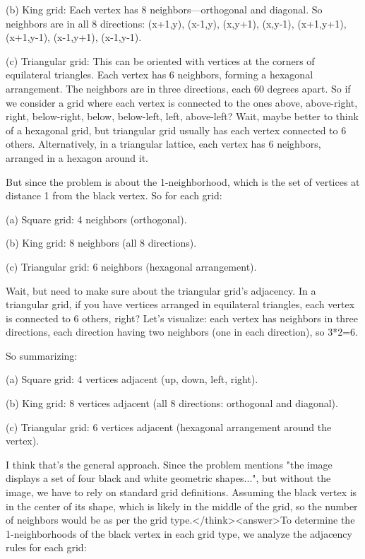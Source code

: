 (b) King grid: Each vertex has 8 neighbors—orthogonal and diagonal. So neighbors are in all 8 directions: (x+1,y), (x-1,y), (x,y+1), (x,y-1), (x+1,y+1), (x+1,y-1), (x-1,y+1), (x-1,y-1).

(c) Triangular grid: This can be oriented with vertices at the corners of equilateral triangles. Each vertex has 6 neighbors, forming a hexagonal arrangement. The neighbors are in three directions, each 60 degrees apart. So if we consider a grid where each vertex is connected to the ones above, above-right, right, below-right, below, below-left, left, above-left? Wait, maybe better to think of a hexagonal grid, but triangular grid usually has each vertex connected to 6 others. Alternatively, in a triangular lattice, each vertex has 6 neighbors, arranged in a hexagon around it.

But since the problem is about the 1-neighborhood, which is the set of vertices at distance 1 from the black vertex. So for each grid:

(a) Square grid: 4 neighbors (orthogonal).

(b) King grid: 8 neighbors (all 8 directions).

(c) Triangular grid: 6 neighbors (hexagonal arrangement).

Wait, but need to make sure about the triangular grid's adjacency. In a triangular grid, if you have vertices arranged in equilateral triangles, each vertex is connected to 6 others, right? Let's visualize: each vertex has neighbors in three directions, each direction having two neighbors (one in each direction), so 3*2=6.

So summarizing:

(a) Square grid: 4 vertices adjacent (up, down, left, right).

(b) King grid: 8 vertices adjacent (all 8 directions: orthogonal and diagonal).

(c) Triangular grid: 6 vertices adjacent (hexagonal arrangement around the vertex).

I think that's the general approach. Since the problem mentions "the image displays a set of four black and white geometric shapes...", but without the image, we have to rely on standard grid definitions. Assuming the black vertex is in the center of its shape, which is likely in the middle of the grid, so the number of neighbors would be as per the grid type.</think><answer>To determine the 1-neighborhoods of the black vertex in each grid type, we analyze the adjacency rules for each grid:  


